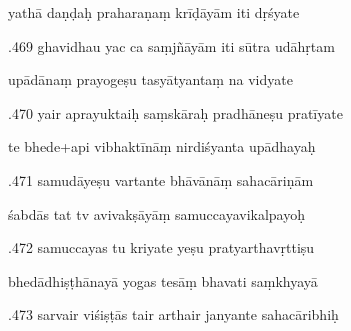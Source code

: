 \documentclass[article,12pt,a4paper]{memoir}%
\newcounter{parCount}
\begin{document}
	  
	  \pstart \leavevmode%
	yathā daṇḍaḥ praharaṇaṃ krīḍāyām iti dṛśyate 
	{}
	\pend%
      

	  
	  \pstart {}.469 ghavidhau yac ca saṃjñāyām iti sūtra udāhṛtam 
	{}
	\pend%
      

	  
	  \pstart \leavevmode%
	upādānaṃ prayogeṣu tasyātyantaṃ na vidyate 
	{}
	\pend%
      

	  
	  \pstart {}.470 yair aprayuktaiḥ saṃskāraḥ pradhāneṣu pratīyate 
	{}
	\pend%
      

	  
	  \pstart \leavevmode%
	te bhede+api vibhaktīnāṃ nirdiśyanta upādhayaḥ 
	{}
	\pend%
      

	  
	  \pstart {}.471 samudāyeṣu vartante bhāvānāṃ sahacāriṇām 
	{}
	\pend%
      

	  
	  \pstart \leavevmode%
	śabdās tat tv avivakṣāyāṃ samuccayavikalpayoḥ 
	{}
	\pend%
      

	  
	  \pstart {}.472 samuccayas tu kriyate yeṣu pratyarthavṛttiṣu 
	{}
	\pend%
      

	  
	  \pstart \leavevmode%
	bhedādhiṣṭhānayā yogas tesāṃ bhavati saṃkhyayā 
	{}
	\pend%
      

	  
	  \pstart {}.473 sarvair viśiṣṭās tair arthair janyante sahacāribhiḥ 
	{}
	\pend%
      
\end{document}
